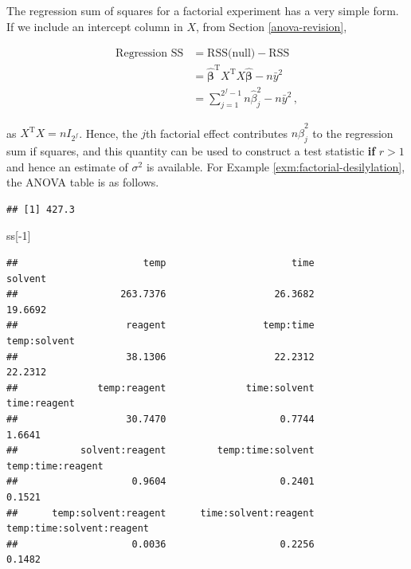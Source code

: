 \documentclass[
]{book}
\newenvironment{Shaded}{\begin{snugshade}}{\end{snugshade}}
\newcommand{\DecValTok}[1]{\textcolor[rgb]{0.00,0.00,0.81}{#1}}
\newcommand{\FunctionTok}[1]{\textcolor[rgb]{0.00,0.00,0.00}{#1}}
\newcommand{\NormalTok}[1]{#1}
\newcommand{\OtherTok}[1]{\textcolor[rgb]{0.56,0.35,0.01}{#1}}
\newcommand{\SpecialCharTok}[1]{\textcolor[rgb]{0.00,0.00,0.00}{#1}}
\theoremstyle{definition}
\theoremstyle{definition}
\theoremstyle{definition}
\theoremstyle{definition}
\theoremstyle{remark}
\begin{document}
The regression sum of squares for a factorial experiment has a very simple form. If we include an intercept column in \(X\), from Section \ref{anova-revision},

\begin{align*}
\mbox{Regression SS} & = \mbox{RSS(null)} - \mbox{RSS} \\
& = \hat{\boldsymbol{\beta}}^{\mathrm{T}}X^{\mathrm{T}}X\hat{\boldsymbol{\beta}} - n\bar{y}^2 \\
& = \sum_{j=1}^{2^f-1}n\hat{\beta}_j^2 - n\bar{y}^2\,,
\end{align*}

as \(X^{\mathrm{T}}X = nI_{2^f}\). Hence, the \(j\)th factorial effect contributes \(n\hat{\beta}_j^2\) to the regression sum if squares, and this quantity can be used to construct a test statistic \textbf{if} \(r>1\) and hence an estimate of \(\sigma^2\) is available. For Example \ref{exm:factorial-desilylation}, the ANOVA table is as follows.

\begin{Shaded}
\end{Shaded}

\begin{verbatim}
## [1] 427.3
\end{verbatim}

\begin{Shaded}
\begin{Highlighting}[]
\NormalTok{ss[}\SpecialCharTok{{-}}\DecValTok{1}\NormalTok{]}
\end{Highlighting}
\end{Shaded}

\begin{verbatim}
##                      temp                      time                   solvent 
##                  263.7376                   26.3682                   19.6692 
##                   reagent                 temp:time              temp:solvent 
##                   38.1306                   22.2312                   22.2312 
##              temp:reagent              time:solvent              time:reagent 
##                   30.7470                    0.7744                    1.6641 
##           solvent:reagent         temp:time:solvent         temp:time:reagent 
##                    0.9604                    0.2401                    0.1521 
##      temp:solvent:reagent      time:solvent:reagent temp:time:solvent:reagent 
##                    0.0036                    0.2256                    0.1482
\end{verbatim}
\end{document}
